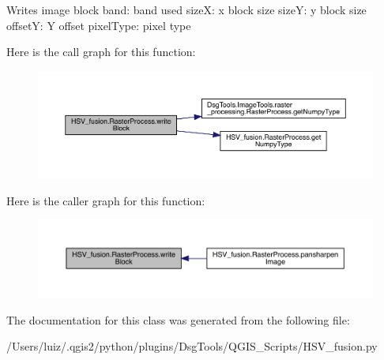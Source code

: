 \begin{DoxyVerb}Writes image block
band: band used
sizeX: x block size
sizeY: y block size
offsetY: Y offset
pixelType: pixel type
\end{DoxyVerb}
 Here is the call graph for this function\+:
\nopagebreak
\begin{figure}[H]
\begin{center}
\leavevmode
\includegraphics[width=350pt]{class_h_s_v__fusion_1_1_raster_process_a602e8caa6f0961893dafcb169f191373_cgraph}
\end{center}
\end{figure}
Here is the caller graph for this function\+:
\nopagebreak
\begin{figure}[H]
\begin{center}
\leavevmode
\includegraphics[width=350pt]{class_h_s_v__fusion_1_1_raster_process_a602e8caa6f0961893dafcb169f191373_icgraph}
\end{center}
\end{figure}


The documentation for this class was generated from the following file\+:\begin{DoxyCompactItemize}
\item 
/\+Users/luiz/.\+qgis2/python/plugins/\+Dsg\+Tools/\+Q\+G\+I\+S\+\_\+\+Scripts/H\+S\+V\+\_\+fusion.\+py\end{DoxyCompactItemize}
